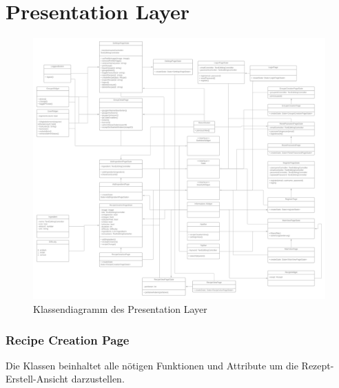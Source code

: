 \documentclass[parskip=full]{scrartcl}
\begin{document}
\section{Presentation Layer}
\begin{figure}[htp]
    \centering
    \includegraphics[width = \textwidth]{images/presentationLayer/presentationLayer.png}
    \caption{Klassendiagramm des Presentation Layer}
    \label{fig:presentation-layer}
\end{figure}

\newpage
\subsubsection{Recipe Creation Page}
Die Klassen beinhaltet alle nötigen Funktionen und Attribute um die Rezept-Erstell-Ansicht darzustellen.\newline
\end{document}

